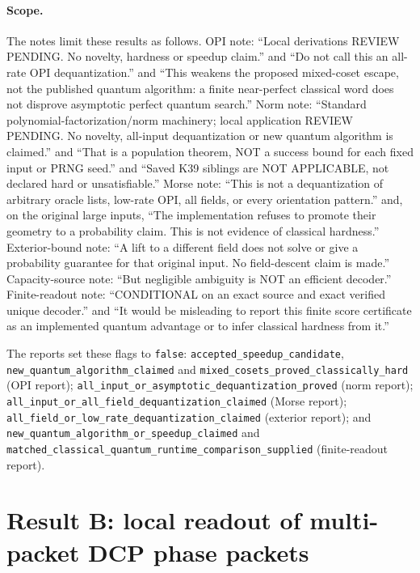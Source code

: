 \documentclass[10pt]{article}
\begin{document}
\paragraph{Scope.} The notes limit these results as follows. OPI note: ``Local derivations REVIEW PENDING. No novelty, hardness or speedup claim.'' and ``Do not call this an all-rate OPI dequantization.'' and ``This weakens the proposed mixed-coset escape, not the published quantum algorithm: a finite near-perfect classical word does not disprove asymptotic perfect quantum search.'' Norm note: ``Standard polynomial-factorization/norm machinery; local application REVIEW PENDING. No novelty, all-input dequantization or new quantum algorithm is claimed.'' and ``That is a population theorem, NOT a success bound for each fixed input or PRNG seed.'' and ``Saved K39 siblings are NOT APPLICABLE, not declared hard or unsatisfiable.'' Morse note: ``This is not a dequantization of arbitrary oracle lists, low-rate OPI, all fields, or every orientation pattern.'' and, on the original large inputs, ``The implementation refuses to promote their geometry to a probability claim. This is not evidence of classical hardness.'' Exterior-bound note: ``A lift to a different field does not solve or give a probability guarantee for that original input. No field-descent claim is made.'' Capacity-source note: ``But negligible ambiguity is NOT an efficient decoder.'' Finite-readout note: ``CONDITIONAL on an exact source and exact verified unique decoder.'' and ``It would be misleading to report this finite score certificate as an implemented quantum advantage or to infer classical hardness from it.''
\begin{flushleft}
The reports set these flags to \texttt{false}: \texttt{accepted\_speedup\_candidate}, \texttt{new\_quantum\_algorithm\_claimed} and \texttt{mixed\_cosets\_proved\_classically\_hard} (OPI report); \texttt{all\_input\_or\_asymptotic\_dequantization\_proved} (norm report); \texttt{all\_input\_or\_all\_field\_dequantization\_claimed} (Morse report); \texttt{all\_field\_or\_low\_rate\_dequantization\_claimed} (exterior report); and \texttt{new\_quantum\_algorithm\_or\_speedup\_claimed} and \texttt{matched\_classical\_quantum\_runtime\_comparison\_supplied} (finite-readout report).
\end{flushleft}

\section{Result B: local readout of multi-packet DCP phase packets}
\label{sec:dcp}
\end{document}
